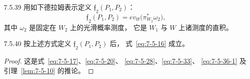 \begin{definition}{7.5.39}\label{def:7-5-39}
用如下德拉姆表示定义
$\mathfrak f_2(P_1,P_2)$：
\[
\mathfrak f_2(P_1,P_2)
=ev_{0!}\bigl(\pi_{W_2}^*\omega_2\bigr),
\]
其中 $\omega_2$ 是固定在 $W_2$ 上的光滑概率测度，
它是 $W_1$ 与 $W$ 上诸测度的直积。
\end{definition}

\begin{proposition}{7.5.40}\label{prop:7-5-40}
按上述方式定义 $\mathfrak f_2(P_1,P_2)$ 后，
式~\eqref{eq:7-5-16} 成立。
\end{proposition}

\begin{proof}
这是式~\eqref{eq:7-5-17}、\eqref{eq:7-5-20}、
\eqref{eq:7-5-28}、\eqref{eq:7-5-33}、
\eqref{eq:7-5-36-1} 及引理~\ref{lem:7-5-10} 的推论。
\end{proof}
